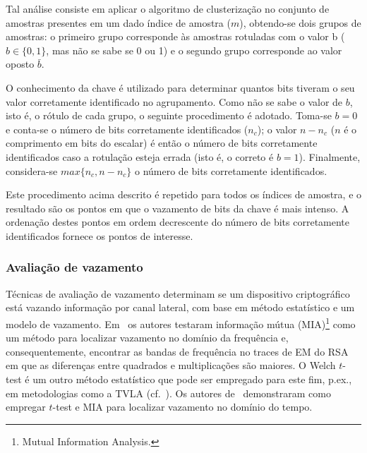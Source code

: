 Tal análise consiste em aplicar o algoritmo de clusterização no conjunto de amostras presentes em um dado índice de amostra ($m$), obtendo-se dois grupos de amostras: o primeiro grupo corresponde às amostras rotuladas com o valor b ($b\in \{0,1\}$, mas não se sabe se 0 ou 1) e o segundo grupo corresponde ao valor oposto $\bar{b}$. 

O conhecimento da chave é utilizado para determinar quantos bits tiveram o seu valor corretamente identificado no agrupamento. Como não se sabe o valor de $b$, isto é, o rótulo de cada grupo, o seguinte procedimento é adotado. Toma-se $b=0$ e conta-se o número de bits corretamente identificados ($n_c$); o valor $n - n_c$ ($n$ é o comprimento em bits do escalar) é então o número de bits corretamente identificados caso a rotulação esteja errada (isto é, o correto é $b=1$). Finalmente, considera-se $max\{n_c, n - n_c\}$ o número de bits corretamente identificados.

Este procedimento acima descrito é repetido para todos os índices de amostra, e o resultado são os pontos em que o vazamento de bits da chave é mais intenso. A ordenação destes pontos em ordem decrescente do número de bits corretamente identificados fornece os pontos de interesse.


\subsubsection{Avaliação de vazamento} %

Técnicas de avaliação de vazamento determinam se um dispositivo criptográfico está vazando informação por canal lateral, com base em método estatístico e um modelo de vazamento. 
Em~\cite{Meynard2011} os autores testaram informação mútua (MIA)\footnote{Mutual Information Analysis.} como um método para localizar vazamento no domínio da frequência e, consequentemente, encontrar as bandas de frequência no traces de EM do RSA em que as diferenças entre quadrados e multiplicações são maiores. O Welch $t$-test é um outro método estatístico que pode ser empregado para este fim, p.ex., em metodologias como a TVLA (cf.~). Os autores de~\cite{MatherOswaldBandenburg2013} demonstraram como empregar $t$-test e MIA para localizar vazamento no domínio do tempo.

